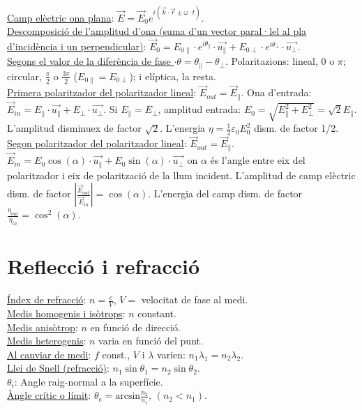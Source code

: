 \documentclass[12pt]{article}
\begin{document}
\begin{multicols}{4}
\ul{Camp el\`ectric ona plana}: $\vec{E} = \vec{E}_0 e^{i\left( \vec{k}\cdot\vec{r} \pm \omega\cdot t \right)}$.\\
\ul{Descomposició de l'amplitud d'ona (suma d'un vector paral·lel al pla d'incidència i un perpendicular)}: $\vec{E}_0 = E_{0\parallel} \cdot e^{i\theta_{\parallel}}\cdot \vec{u_{\parallel}} + E_{0\perp} \cdot e^{i\theta_{\perp}} \cdot \vec{u_{\perp}} $.\\
\ul{Segons el valor de la diferència de fase $·\theta = \theta_{\parallel} - \theta_{\perp}$}. Polaritazions: lineal, 0 o $\pi$; circular, $\frac{\pi}{2}$ o $\frac{3\pi}{2}$ ($E_{0\parallel} = E_{0\perp}$); i elíptica, la resta.\\
\ul{Primera polaritzador del polaritzador lineal}: $\vec{E}_{out} = \vec{E}_{\parallel}$. Ona d'entrada: $\vec{E}_{in} = E_{\parallel} \cdot \vec{u_{\parallel}} + E_{\perp}\cdot \vec{u_{\perp}}$. Si $E_{\parallel} = E_{\perp}$, amplitud entrada: $E_{0} = \sqrt{E_{\parallel}^{2} + E_{\perp}^{2}} = \sqrt{2}E_{\parallel}$. L'amplitud disminuex de factor $\sqrt{2}$. L'energia $\eta = \frac{1}{2} \varepsilon_0 E_{0}^{2}$ dism. de factor 1/2.\\
\ul{Segon polaritzador del polaritzador lineal}: $\vec{E}_{out} = \vec{E}_{\parallel}$. $\vec{E}_{in} = E_{0}\cos(\alpha) \cdot \vec{u_{\parallel}} + E_{0}\sin(\alpha)\cdot \vec{u_{\perp}}$ on $\alpha$ és l'angle entre eix del polaritzador i eix de polarització de la llum incident. L'amplitud de camp elèctric dism. de factor $\left|\frac{\vec{E}_{out}}{\vec{E}_{in}}\right| = \cos(\alpha)$. L'energia del camp dism. de factor $\frac{\eta_{out}}{\eta_{in}} = \cos^2(\alpha)$.
\section{Reflecci\'o i refracci\'o}

\ul{\'Index de refracci\'o}: $n = \frac{c}{V}$, $V =$ velocitat de fase al medi. \\
\ul{Medis homogenis i is\`otrops}: $n$ constant. \\
\ul{Medis anis\`otrop}: $n$ en funci\'o de direcci\'o. \\
\ul{Medis heterogenis}: $n$ varia en funci\'o del punt. \\
\ul{Al canviar de medi}: $f$ const., $V$ i $\lambda$ varien: $n_1 \lambda_1= n_2 \lambda_2$. \\
\ul{Llei de Snell (refracci\'o)}: $n_1\sin\theta_1 = n_2\sin\theta_2$. \\
\ul{$\theta_i$}: Angle raig-normal a la superf\'icie. \\
\ul{\`Angle cr\'itic o l\'imit}: $\theta_{\text{c}} = \text{arcsin} \frac{n_2}{n_1}, \, (n_2 < n_1).$


\end{multicols}
\end{document}
